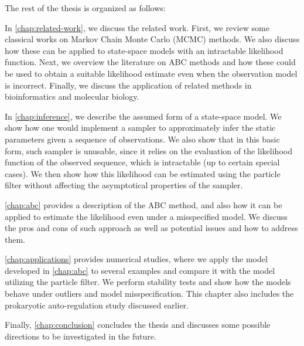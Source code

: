 The rest of the thesis is organized as follows:

In \autoref{chap:related-work}, we discuss the related work. First, we review some classical works on Markov Chain Monte Carlo (MCMC) methods. We also discuss how these can be applied to state-space models with an intractable likelihood function. Next, we overview the literature on ABC methods and how these could be used to obtain a suitable likelihood estimate even when the observation model is incorrect. Finally, we discuss the application of related methods in bioinformatics and molecular biology.

In \autoref{chap:inference}, we describe the assumed form of a state-space model. We show how one would implement a sampler to approximately infer the static parameters given a sequence of observations. We also show that in this basic form, such sampler is unusable, since it relies on the evaluation of the likelihood function of the observed sequence, which is intractable (up to certain special cases). We then show how this likelihood can be estimated using the particle filter \citep{particle-filter} without affecting the asymptotical properties of the sampler.

\autoref{chap:abc} provides a description of the ABC method, and also how it can be applied to estimate the likelihood even under a misspecified model. We discuss the pros and cons of such approach as well as potential issues and how to address them.

\autoref{chap:applications} provides numerical studies, where we apply the model developed in \autoref{chap:abc} to several examples and compare it with the model utilizing the particle filter. We perform stability tests and show how the models behave under outliers and model misspecification. This chapter also includes the prokaryotic auto-regulation study discussed earlier.

Finally, \autoref{chap:conclusion} concludes the thesis and discusses some possible directions to be investigated in the future.
